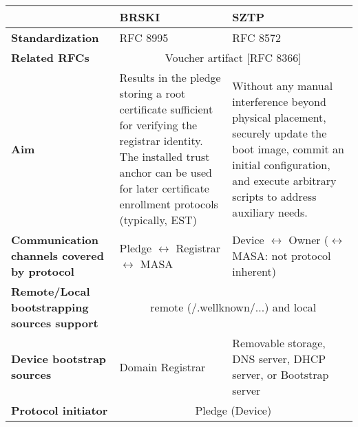 
\begin{landscape}
\begin{longtable}{|p{5cm}|l|l|}
		\hline
		\rowcolor[rgb]{ .745,  .804,  .843}  & \textbf{BRSKI} & \textbf{SZTP} \bigstrut\\
		\hline
		\endhead

		\rowcolor[rgb]{ .745,  .804,  .843} \textbf{Standardization} & \cellcolor[rgb]{ 1,  1,  1}RFC 8995 & \cellcolor[rgb]{ 1,  1,  1}RFC 8572 \bigstrut\\

		\hline
		\rowcolor[rgb]{ .745,  .804,  .843} \textbf{Related RFCs} & \multicolumn{2}{c|}{\cellcolor[rgb]{ 1,  1,  1}Voucher artifact [RFC 8366]} \bigstrut\\
		\hline

		\rowcolor[rgb]{ .745,  .804,  .843} \textbf{Aim} & \multicolumn{1}{p{18.335em}|}{\cellcolor[rgb]{ 1,  1,  1}Results in the pledge storing a root certificate sufficient for verifying the registrar identity. The installed trust anchor can be used for later certificate enrollment protocols (typically, EST)} & \multicolumn{1}{p{18.335em}|}{\cellcolor[rgb]{ 1,  1,  1}Without any manual interference beyond physical placement, securely update the boot image, commit an initial configuration, and execute arbitrary scripts to address auxiliary needs.} \bigstrut\\

		\hline
		\rowcolor[rgb]{ .745,  .804,  .843} \textbf{Communication channels covered by protocol} & \cellcolor[rgb]{ 1,  1,  1}Pledge $ \leftrightarrow $ Registrar $ \leftrightarrow $ MASA & \multicolumn{1}{p{18.335em}|}{\cellcolor[rgb]{ 1,  1,  1}Device $ \leftrightarrow $ Owner ($ \leftrightarrow $ MASA: not protocol inherent)} \bigstrut\\
		\hline

		\rowcolor[rgb]{ .745,  .804,  .843} \textbf{Remote/Local bootstrapping sources support} & \multicolumn{2}{c|}{ \cellcolor[rgb]{ 1,  1,  1} remote (/.wellknown/...) and local } \bigstrut\\

		\hline
		\rowcolor[rgb]{ .745,  .804,  .843} \textbf{Device bootstrap sources} & \cellcolor[rgb]{ 1,  1,  1}Domain Registrar & \multicolumn{1}{p{18.335em}|}{\cellcolor[rgb]{ 1,  1,  1}Removable storage, DNS server, DHCP server, or Bootstrap server} \bigstrut\\

		\hline
		\rowcolor[rgb]{ .745,  .804,  .843} \textbf{Protocol initiator} & \multicolumn{2}{c|}{\cellcolor[rgb]{ 1,  1,  1}Pledge (Device)} \bigstrut\\


\end{longtable}
\end{landscape}
